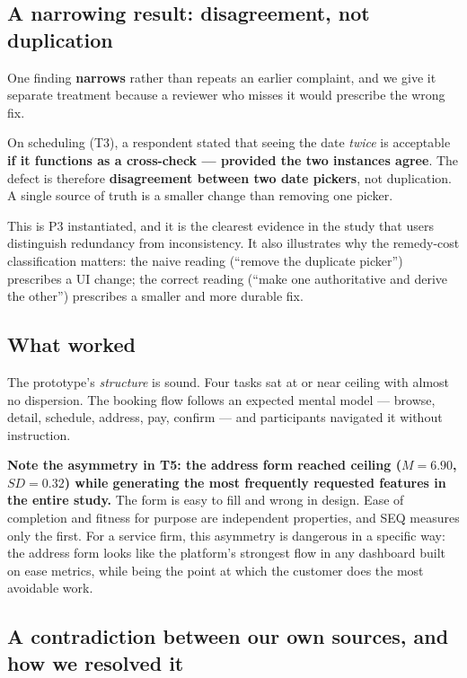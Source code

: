 \documentclass[]{interact}
\theoremstyle{plain}
\begin{document}
\subsection{A narrowing result: disagreement, not duplication}
\label{sec:narrowing}

One finding \textbf{narrows} rather than repeats an earlier complaint, and we give it separate
treatment because a reviewer who misses it would prescribe the wrong fix.

On scheduling (T3), a respondent stated that seeing the date \emph{twice} is acceptable \textbf{if it
functions as a cross-check --- provided the two instances agree}. The defect is therefore
\textbf{disagreement between two date pickers}, not duplication. A single source of truth is a smaller
change than removing one picker.

This is P3 instantiated, and it is the clearest evidence in the study that users distinguish redundancy
from inconsistency. It also illustrates why the remedy-cost classification matters: the naive reading
(``remove the duplicate picker'') prescribes a UI change; the correct reading (``make one authoritative
and derive the other'') prescribes a smaller and more durable fix.

\subsection{What worked}

The prototype's \emph{structure} is sound. Four tasks sat at or near ceiling with almost no dispersion.
The booking flow follows an expected mental model --- browse, detail, schedule, address, pay, confirm
--- and participants navigated it without instruction.

\textbf{Note the asymmetry in T5: the address form reached ceiling ($M = 6.90$, $SD = 0.32$) while
generating the most frequently requested features in the entire study.} The form is easy to fill and
wrong in design. Ease of completion and fitness for purpose are independent properties, and SEQ
measures only the first. For a service firm, this asymmetry is dangerous in a specific way: the
address form looks like the platform's strongest flow in any dashboard built on ease metrics, while
being the point at which the customer does the most avoidable work.

\subsection{A contradiction between our own sources, and how we resolved it}
\end{document}
